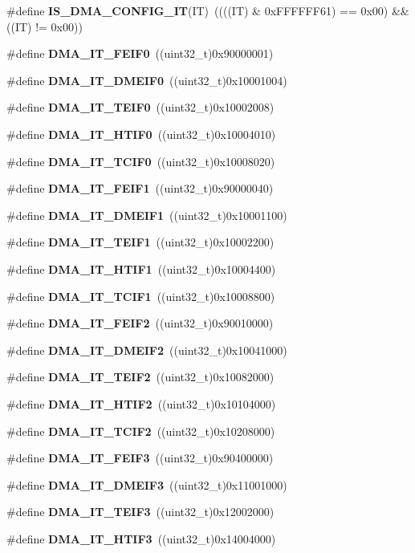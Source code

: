 \begin{DoxyCompactItemize}
\#define \textbf{ I\+S\+\_\+\+D\+M\+A\+\_\+\+C\+O\+N\+F\+I\+G\+\_\+\+IT}(IT)~((((IT) \& 0x\+F\+F\+F\+F\+F\+F61) == 0x00) \&\& ((\+I\+T) != 0x00))
\item 
\#define \textbf{ D\+M\+A\+\_\+\+I\+T\+\_\+\+F\+E\+I\+F0}~((uint32\+\_\+t)0x90000001)
\item 
\#define \textbf{ D\+M\+A\+\_\+\+I\+T\+\_\+\+D\+M\+E\+I\+F0}~((uint32\+\_\+t)0x10001004)
\item 
\#define \textbf{ D\+M\+A\+\_\+\+I\+T\+\_\+\+T\+E\+I\+F0}~((uint32\+\_\+t)0x10002008)
\item 
\#define \textbf{ D\+M\+A\+\_\+\+I\+T\+\_\+\+H\+T\+I\+F0}~((uint32\+\_\+t)0x10004010)
\item 
\#define \textbf{ D\+M\+A\+\_\+\+I\+T\+\_\+\+T\+C\+I\+F0}~((uint32\+\_\+t)0x10008020)
\item 
\#define \textbf{ D\+M\+A\+\_\+\+I\+T\+\_\+\+F\+E\+I\+F1}~((uint32\+\_\+t)0x90000040)
\item 
\#define \textbf{ D\+M\+A\+\_\+\+I\+T\+\_\+\+D\+M\+E\+I\+F1}~((uint32\+\_\+t)0x10001100)
\item 
\#define \textbf{ D\+M\+A\+\_\+\+I\+T\+\_\+\+T\+E\+I\+F1}~((uint32\+\_\+t)0x10002200)
\item 
\#define \textbf{ D\+M\+A\+\_\+\+I\+T\+\_\+\+H\+T\+I\+F1}~((uint32\+\_\+t)0x10004400)
\item 
\#define \textbf{ D\+M\+A\+\_\+\+I\+T\+\_\+\+T\+C\+I\+F1}~((uint32\+\_\+t)0x10008800)
\item 
\#define \textbf{ D\+M\+A\+\_\+\+I\+T\+\_\+\+F\+E\+I\+F2}~((uint32\+\_\+t)0x90010000)
\item 
\#define \textbf{ D\+M\+A\+\_\+\+I\+T\+\_\+\+D\+M\+E\+I\+F2}~((uint32\+\_\+t)0x10041000)
\item 
\#define \textbf{ D\+M\+A\+\_\+\+I\+T\+\_\+\+T\+E\+I\+F2}~((uint32\+\_\+t)0x10082000)
\item 
\#define \textbf{ D\+M\+A\+\_\+\+I\+T\+\_\+\+H\+T\+I\+F2}~((uint32\+\_\+t)0x10104000)
\item 
\#define \textbf{ D\+M\+A\+\_\+\+I\+T\+\_\+\+T\+C\+I\+F2}~((uint32\+\_\+t)0x10208000)
\item 
\#define \textbf{ D\+M\+A\+\_\+\+I\+T\+\_\+\+F\+E\+I\+F3}~((uint32\+\_\+t)0x90400000)
\item 
\#define \textbf{ D\+M\+A\+\_\+\+I\+T\+\_\+\+D\+M\+E\+I\+F3}~((uint32\+\_\+t)0x11001000)
\item 
\#define \textbf{ D\+M\+A\+\_\+\+I\+T\+\_\+\+T\+E\+I\+F3}~((uint32\+\_\+t)0x12002000)
\item 
\#define \textbf{ D\+M\+A\+\_\+\+I\+T\+\_\+\+H\+T\+I\+F3}~((uint32\+\_\+t)0x14004000)

\end{DoxyCompactItemize}
